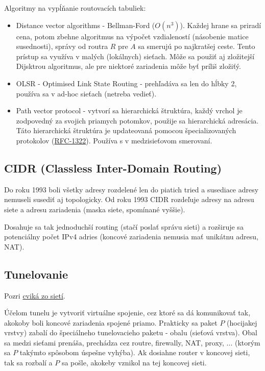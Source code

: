 \documentclass[10pt,a4paper]{article}
\begin{document}
Algoritmy na vypĺňanie routovacích tabuliek:
\begin{itemize}
\item Distance vector algorithms - Bellman-Ford ($O(n^3)$). Každej hrane sa priradí cena, potom zbehne algoritmus na výpočet vzdialeností (násobenie matice susednosti), správy od routra $R$ pre $A$ sa smerujú po najkratšej ceste. Tento prístup sa využíva v malých (lokálnych) sieťach. Môže sa použiť aj zložitejší Dijsktrou algoritmus, ale pre niektoré zariadenia môže byť príliš zložiťý.           
\item OLSR - Optimised Link State Routing - prehľadáva sa len do hĺbky 2, používa sa v ad-hoc sieťach (netreba vedieť). 
\item Path vector protocol - vytvorí sa hierarchická štruktúra, každý vrchol je zodpovedný za svojich priamych potomkov, použije sa hierarchická adresácia. Táto hierarchická štruktúra je updateovaná pomocou špecializovaných protokolov (\href{http://tools.ietf.org/html/rfc1322}{RFC-1322}). Používa s v medzisieťovom smerovaní.  
\end{itemize}
    
\subsection{CIDR (Classless Inter-Domain Routing)} 
Do roku 1993 boli všetky adresy rozdelené len do piatich tried a susediace adresy nemuseli susediť aj topologicky. Od roku 1993 CIDR rozdeľuje adresy na adresu siete a adresu zariadenia (maska siete, spomínané vyššie). 

Dosahuje sa tak jednoduchší routing (stačí poslať správu sieti) a rozširuje sa potenciálny počet IPv4 adries (koncové zariadenia nemusia mať unikátnu adresu, NAT). 

\subsection{Tunelovanie}          
Pozri \href{http://netlab.dcs.fmph.uniba.sk/siete/cviko11/}{cviká zo sietí}.
                                  
Účelom tunelu je vytvoriť virtuálne spojenie, cez ktoré sa dá komunikovať tak, akokoby boli koncové zariadenia spojené priamo. 
Prakticky sa paket $P$ (hocijakej vrstvy) zabalí do špeciálneho tunelovacieho paketu - obalu (sieťová vrstva). Obal sa medzi sieťami prenáša, prechádza cez routre, firewally, NAT, proxy, ... (ktorým sa $P$ takýmto spôsobom úspešne vyhýba). 
Ak dosiahne router v koncovej sieti, tak sa rozbalí a $P$ sa pošle, akokeby vznikol na tej koncovej sieti. 
\end{document}
